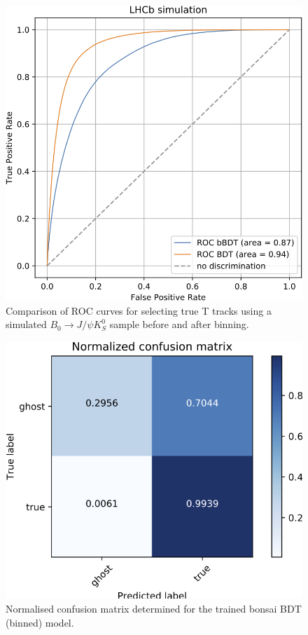 \begin{figure}
\centering
\hspace*{-1cm}\includegraphics[scale=0.6]{figures/bBDT_roc.png}
\caption{Comparison of ROC curves for selecting true T tracks using a simulated $B_0\rightarrow J/\psi K_S^0 $ sample before and after binning.}
\label{fig:ROC binned}
\end{figure}


\begin{figure}
\centering
\hspace*{-1cm}\includegraphics[scale=0.6]{figures/bBDT_normalized_cm.png}
\caption{Normalised confusion matrix determined for the trained bonsai BDT (binned) model.}
\label{fig:CM normalized}
\end{figure}

